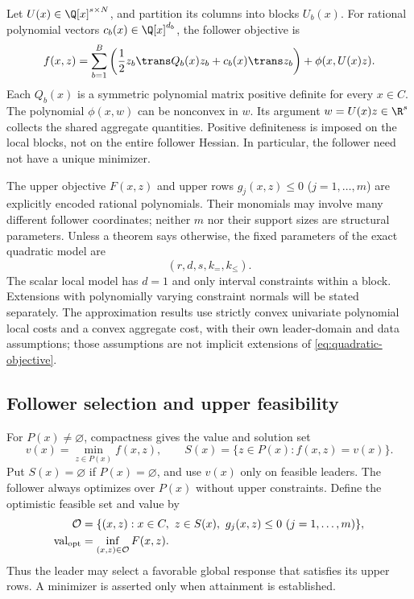 Let $U(x)\in\Q[x]^{s\times N}$, and partition its columns into blocks
$U_b(x)$. For rational polynomial vectors $c_b(x)\in\Q[x]^{d_b}$,
the follower objective is
\begin{equation}\label{eq:quadratic-objective}
 f(x,z)=\sum_{b=1}^B\left(\frac12 z_b\trans Q_b(x)z_b+
                c_b(x)\trans z_b\right)+\phi(x,U(x)z).
\end{equation}
Each $Q_b(x)$ is a symmetric polynomial matrix positive definite for
every $x\in C$. The polynomial $\phi(x,w)$ can be nonconvex in $w$.
Its argument $w=U(x)z\in\R^s$ collects the shared aggregate quantities.
Positive definiteness is imposed on the local blocks, not on the entire
follower Hessian. In particular, the follower need not have a unique
minimizer.

The upper objective $F(x,z)$ and upper rows $g_j(x,z)\le0$
($j=1,\ldots,m$) are explicitly encoded rational polynomials.
Their monomials may involve many different follower coordinates; neither
$m$ nor their support sizes are structural parameters. Unless a theorem
says otherwise, the fixed parameters of the exact quadratic model are
\begin{equation}\label{eq:structural-parameters}
                    (r,d,s,k_=,k_{\le}).
\end{equation}
The scalar local model has $d=1$ and only interval constraints within a
block. Extensions with polynomially varying constraint normals will be
stated separately. The approximation results use strictly convex
univariate polynomial local costs and a convex aggregate cost, with their
own leader-domain and data assumptions; those assumptions are not
implicit extensions of \eqref{eq:quadratic-objective}.

\subsection{Follower selection and upper feasibility}\label{subsec:semantics}

For $P(x)\ne\varnothing$, compactness gives the value and solution set
\begin{equation}\label{eq:follower-value}
 v(x)=\min_{z\in P(x)} f(x,z),\qquad
 S(x)=\{z\in P(x):f(x,z)=v(x)\}.
\end{equation}
Put $S(x)=\varnothing$ if $P(x)=\varnothing$, and use $v(x)$ only
on feasible leaders. The follower always optimizes over $P(x)$ without
upper constraints. Define the optimistic feasible set and value by
\begin{align}
 \mathcal O&=\{(x,z):x\in C,\ z\in S(x),\
                             g_j(x,z)\le0\ (j=1,\ldots,m)\},
 \label{eq:optimistic-set}\\
 \operatorname{val}_{\rm opt}&=\inf_{(x,z)\in\mathcal O} F(x,z).
 \label{eq:optimistic-value}
\end{align}
Thus the leader may select a favorable global response that satisfies its
upper rows. A minimizer is asserted only when attainment is established.

